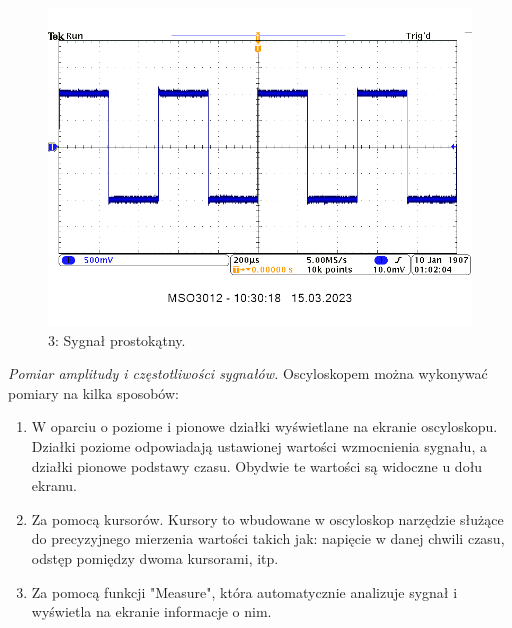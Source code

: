 \documentclass[14pt, table]{extarticle}
\begin{document}
\begin{figure}[H]
\includegraphics[scale=0.7]{A17}
\centering
\captionsetup{labelformat=empty}
\caption{3: Sygnał prostokątny.}
\end{figure}

\newpage
\textit{Pomiar amplitudy i częstotliwości sygnałów.} Oscyloskopem można wykonywać pomiary na kilka sposobów:

\begin{enumerate}
    \item W oparciu o poziome i pionowe działki wyświetlane na ekranie oscyloskopu. Działki poziome odpowiadają ustawionej wartości wzmocnienia sygnału, a działki pionowe podstawy czasu. Obydwie te wartości są widoczne u dołu ekranu.
    \item Za pomocą kursorów. Kursory to wbudowane w oscyloskop narzędzie służące do precyzyjnego mierzenia wartości takich jak: napięcie w danej chwili czasu, odstęp pomiędzy dwoma kursorami, itp.
    \item Za pomocą funkcji "Measure", która automatycznie analizuje sygnał i wyświetla na ekranie informacje o nim.
\end{enumerate}
\end{document}

